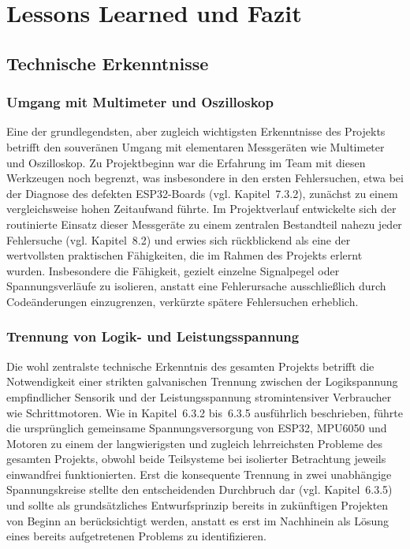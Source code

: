 \documentclass[12pt,ngerman,numbers=noenddot,abstracton,headsepline]{scrreprt}
\begin{document}

\chapter{Lessons Learned und Fazit}
\label{ch:lessons_learned}

\section{Technische Erkenntnisse}
\label{sec:technische_erkenntnisse}

\subsection{Umgang mit Multimeter und Oszilloskop}
\label{subsec:lessons_messtechnik}

Eine der grundlegendsten, aber zugleich wichtigsten Erkenntnisse des Projekts betrifft den souveränen Umgang mit elementaren Messgeräten wie Multimeter und Oszilloskop. Zu Projektbeginn war die Erfahrung im Team mit diesen Werkzeugen noch begrenzt, was insbesondere in den ersten Fehlersuchen, etwa bei der Diagnose des defekten ESP32-Boards (vgl. Kapitel~7.3.2), zunächst zu einem vergleichsweise hohen Zeitaufwand führte. Im Projektverlauf entwickelte sich der routinierte Einsatz dieser Messgeräte zu einem zentralen Bestandteil nahezu jeder Fehlersuche (vgl. Kapitel~8.2) und erwies sich rückblickend als eine der wertvollsten praktischen Fähigkeiten, die im Rahmen des Projekts erlernt wurden. Insbesondere die Fähigkeit, gezielt einzelne Signalpegel oder Spannungsverläufe zu isolieren, anstatt eine Fehlerursache ausschließlich durch Codeänderungen einzugrenzen, verkürzte spätere Fehlersuchen erheblich.

\subsection{Trennung von Logik- und Leistungsspannung}
\label{subsec:lessons_spannungstrennung}

Die wohl zentralste technische Erkenntnis des gesamten Projekts betrifft die Notwendigkeit einer strikten galvanischen Trennung zwischen der Logikspannung empfindlicher Sensorik und der Leistungsspannung stromintensiver Verbraucher wie Schrittmotoren. Wie in Kapitel~6.3.2 bis~6.3.5 ausführlich beschrieben, führte die ursprünglich gemeinsame Spannungsversorgung von ESP32, MPU6050 und Motoren zu einem der langwierigsten und zugleich lehrreichsten Probleme des gesamten Projekts, obwohl beide Teilsysteme bei isolierter Betrachtung jeweils einwandfrei funktionierten. Erst die konsequente Trennung in zwei unabhängige Spannungskreise stellte den entscheidenden Durchbruch dar (vgl. Kapitel~6.3.5) und sollte als grundsätzliches Entwurfsprinzip bereits in zukünftigen Projekten von Beginn an berücksichtigt werden, anstatt es erst im Nachhinein als Lösung eines bereits aufgetretenen Problems zu identifizieren.
\end{document}
